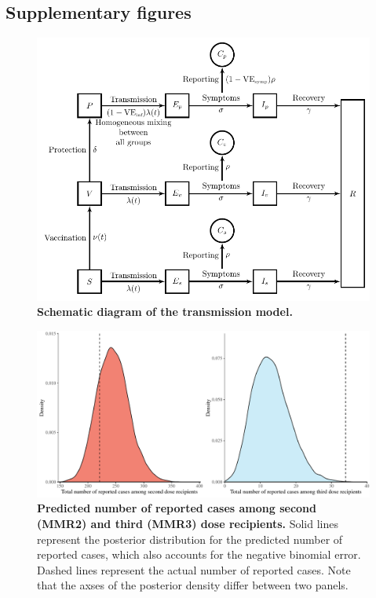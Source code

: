 \documentclass[12pt]{article}
\begin{document}
\pagebreak

\subsection*{Supplementary figures}
\setcounter{figure}{0}
\renewcommand{\thefigure}{S\arabic{figure}}


\begin{figure}[!th]
\includegraphics[width=\textwidth]{../figure/diagram.pdf}
\caption{
\textbf{Schematic diagram of the transmission model.}
}
\label{fig:model}
\end{figure}

\pagebreak

\begin{figure}[!h]
\includegraphics[width=\textwidth]{../figure_stanfit_seirv_final/figure_stanfit_total.pdf}
\caption{
\textbf{Predicted number of reported cases among second (MMR2) and third (MMR3) dose recipients.}
Solid lines represent the posterior distribution for the predicted number of reported cases, which also accounts for the negative binomial error.
Dashed lines represent the actual number of reported cases.
Note that the axses of the posterior density differ between two panels.
}
\end{figure}
\end{document}

